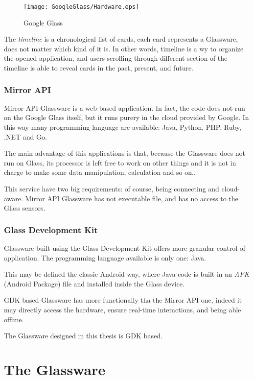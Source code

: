 \begin{figure}[h]
	\centering
	\texttt{[image: GoogleGlass/Hardware.eps]}
	\caption{Google Glass}
	\label{Fig:glasshw}
\end{figure}

The \textit{timeline} is a chronological list of cards, each card represents a Glassware, does not matter which kind of it is.
In other words, timeline is a wy to organize the opened application, and users scrolling through different section of the timeline is able to reveal cards in the past, present, and future.

\subsection{Mirror API}

Mirror API Glassware is a web-based application. In fact, the code does not run on the Google Glass itself, but it runs purery in the cloud provided by Google. In this way many programming language are available: Java, Python, PHP, Ruby, .NET and Go.

The main advantage of this applications is that, because the Glassware does not run on Glass, its processor is left free to work on other things and it is not in charge to make some data manipulation, calculation and so on.. 

This service have two big requirements:  of course, being connecting and cloud-aware. Mirror API Glassware has not executable file, and has no access to the Glass sensors.

\subsection{Glass Development Kit}

Glassware built using the Glass Development Kit offers more granular control of application. The programming language available is only one: Java.

This may be defined the classic Android way, where Java code is built in an \textit{APK} (Android Package) file and installed inside the Glass device.

GDK based Glassware has more functionally tha the Mirror API one, indeed it may directly access the hardware, ensure real-time interactions, and being able offline.

The Glassware designed in this thesis is GDK based.

\chapter{The Glassware}

